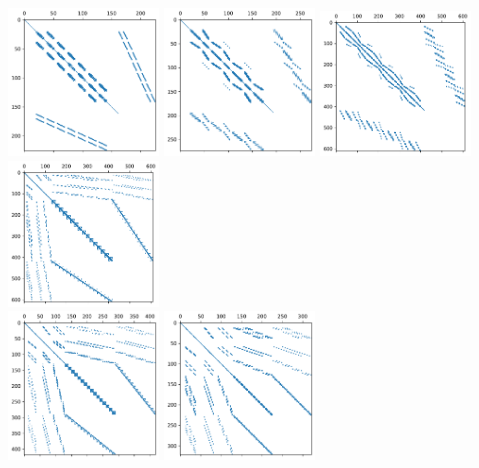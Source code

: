\begin{center}
\includegraphics[width=4cm]{python_codes/fieldstone_78/results/spy/A_bef_topo0.pdf}
\includegraphics[width=4cm]{python_codes/fieldstone_78/results/spy/A_bef_topo1.pdf}
\includegraphics[width=4cm]{python_codes/fieldstone_78/results/spy/A_bef_topo2.pdf}
\includegraphics[width=4cm]{python_codes/fieldstone_78/results/spy/A_bef_topo3.pdf}\\
\includegraphics[width=4cm]{python_codes/fieldstone_78/results/spy/A_bef_topo4.pdf}
\includegraphics[width=4cm]{python_codes/fieldstone_78/results/spy/A_bef_topo5.pdf}

\end{center}
